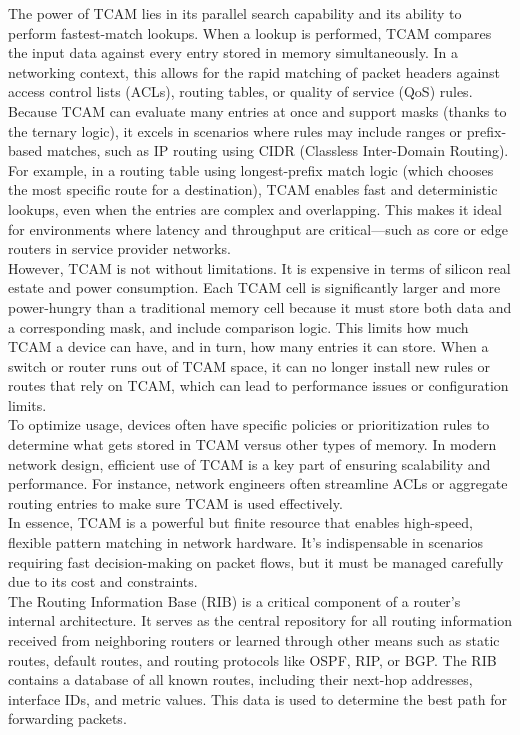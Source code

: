 \documentclass{article}
\begin{document}
The power of TCAM lies in its parallel search capability and its ability to perform fastest-match lookups. When a lookup is performed, TCAM compares the input data against every entry stored in memory simultaneously. In a networking context, this allows for the rapid matching of packet headers against access control lists (ACLs), routing tables, or quality of service (QoS) rules. Because TCAM can evaluate many entries at once and support masks (thanks to the ternary logic), it excels in scenarios where rules may include ranges or prefix-based matches, such as IP routing using CIDR (Classless Inter-Domain Routing).\\

For example, in a routing table using longest-prefix match logic (which chooses the most specific route for a destination), TCAM enables fast and deterministic lookups, even when the entries are complex and overlapping. This makes it ideal for environments where latency and throughput are critical—such as core or edge routers in service provider networks.\\

However, TCAM is not without limitations. It is expensive in terms of silicon real estate and power consumption. Each TCAM cell is significantly larger and more power-hungry than a traditional memory cell because it must store both data and a corresponding mask, and include comparison logic. This limits how much TCAM a device can have, and in turn, how many entries it can store. When a switch or router runs out of TCAM space, it can no longer install new rules or routes that rely on TCAM, which can lead to performance issues or configuration limits.\\

To optimize usage, devices often have specific policies or prioritization rules to determine what gets stored in TCAM versus other types of memory. In modern network design, efficient use of TCAM is a key part of ensuring scalability and performance. For instance, network engineers often streamline ACLs or aggregate routing entries to make sure TCAM is used effectively.\\

In essence, TCAM is a powerful but finite resource that enables high-speed, flexible pattern matching in network hardware. It’s indispensable in scenarios requiring fast decision-making on packet flows, but it must be managed carefully due to its cost and constraints.\\

The Routing Information Base (RIB) is a critical component of a router's internal architecture. It serves as the central repository for all routing information received from neighboring routers or learned through other means such as static routes, default routes, and routing protocols like OSPF, RIP, or BGP. The RIB contains a database of all known routes, including their next-hop addresses, interface IDs, and metric values. This data is used to determine the best path for forwarding packets.\\
\end{document}
